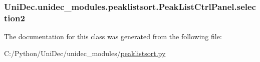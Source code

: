 \subsubsection[{selection2}]{\setlength{\rightskip}{0pt plus 5cm}Uni\+Dec.\+unidec\+\_\+modules.\+peaklistsort.\+Peak\+List\+Ctrl\+Panel.\+selection2}\label{class_uni_dec_1_1unidec__modules_1_1peaklistsort_1_1_peak_list_ctrl_panel_ac3f08415b21e9d9cfb142875dda71685}


The documentation for this class was generated from the following file\+:\begin{DoxyCompactItemize}
\item 
C\+:/\+Python/\+Uni\+Dec/unidec\+\_\+modules/\hyperlink{peaklistsort_8py}{peaklistsort.\+py}\end{DoxyCompactItemize}

